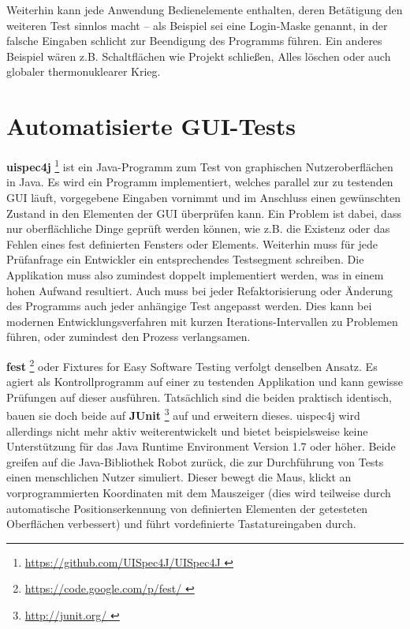 Weiterhin kann jede Anwendung Bedienelemente enthalten, deren Betätigung
den weiteren Test sinnlos macht -- als Beispiel sei eine Login-Maske genannt,
in der falsche Eingaben schlicht zur Beendigung des Programms führen.
Ein anderes Beispiel wären z.B. Schaltflächen wie
\glqq{}Projekt schließen\grqq{}, \glqq{}Alles löschen\grqq{} oder auch 
\glqq{}globaler thermonuklearer Krieg\grqq{}.


\section{Automatisierte GUI-Tests}\label{section:automatedguitesting}


\textbf{uispec4j} \footnote{\url{ https://github.com/UISpec4J/UISpec4J }} ist ein Java-Programm 
zum Test von graphischen Nutzeroberflächen
in Java. Es wird ein Programm implementiert, welches parallel zur zu testenden GUI läuft,
vorgegebene Eingaben vornimmt und im Anschluss einen gewünschten Zustand in den Elementen der GUI
überprüfen kann. Ein Problem ist dabei, dass nur oberflächliche Dinge geprüft werden können,
wie z.B. die Existenz oder das Fehlen eines fest definierten Fensters oder Elements. Weiterhin muss für jede
Prüfanfrage ein Entwickler ein entsprechendes Testsegment schreiben. Die Applikation muss also
zumindest doppelt implementiert werden, was in einem hohen Aufwand resultiert. Auch muss bei jeder
Refaktorisierung oder Änderung des Programms auch jeder anhängige Test angepasst werden.
Dies kann bei modernen Entwicklungsverfahren mit kurzen Iterations-Intervallen zu Problemen führen,
oder zumindest den Prozess verlangsamen.


\vspace{0.5cm}

\textbf{fest} \footnote{\url{ https://code.google.com/p/fest/ }} oder 
\glqq{}Fixtures for Easy Software Testing\grqq{} verfolgt denselben Ansatz.
Es agiert als Kontrollprogramm auf einer zu testenden Applikation und kann gewisse Prüfungen
auf dieser ausführen. Tatsächlich sind die beiden praktisch identisch, bauen sie doch beide
auf \textbf{JUnit} \footnote{\url{ http://junit.org/ }} auf und erweitern dieses.
uispec4j wird allerdings nicht mehr aktiv weiterentwickelt und bietet
beispielsweise keine Unterstützung für das Java Runtime Environment Version \glqq{}1.7\grqq{}
oder höher. Beide greifen auf die Java-Bibliothek \glqq{}Robot\grqq{} zurück,
die zur Durchführung von Tests einen menschlichen Nutzer simuliert. Dieser 
bewegt die Maus, klickt an vorprogrammierten Koordinaten mit dem Mauszeiger
(dies wird teilweise durch automatische Positionserkennung von definierten Elementen
der getesteten Oberflächen verbessert) und führt vordefinierte Tastatureingaben durch.


